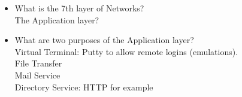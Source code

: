 \begin{itemize}
    \item What is the 7th layer of Networks?\\
    The Application layer?\\

    \item What are two purposes of the Application layer?\\
    Virtual Terminal: Putty to allow remote logins (emulations).\\
    File Transfer\\
    Mail Service\\
    Directory Service: HTTP for example\\
\end{itemize}
